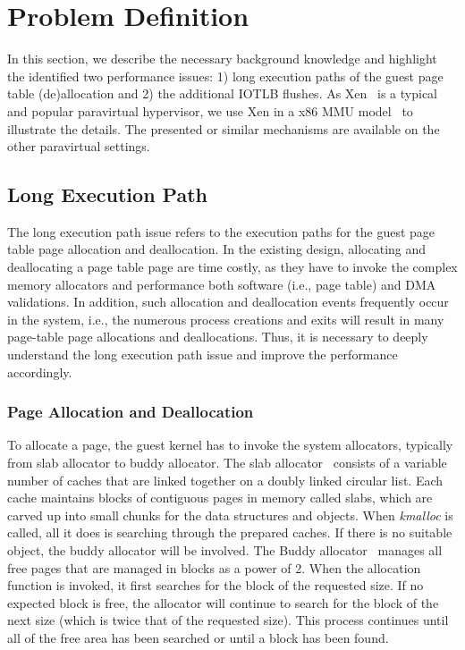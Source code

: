 \section{Problem Definition} \label{sec:prob}
In this section, we describe the necessary background knowledge and highlight the identified two performance issues: 1) long execution paths of the guest page table (de)allocation and 2) the additional IOTLB flushes.
As Xen~\cite{XEN-SOSP03} is a typical and popular paravirtual hypervisor, we use Xen in a x86 MMU model~\cite{x86-pv-model} to illustrate the details.
The presented or similar mechanisms are available on the other paravirtual settings.


\subsection{Long Execution Path}\label{sec:longpath}
The long execution path issue refers to the execution paths for the guest page table page allocation and deallocation.
In the existing design, allocating and deallocating a page table page are time costly, as they have to invoke the complex memory allocators and performance both software (i.e., page table) and DMA validations.
In addition, such allocation and deallocation events frequently occur in the system, i.e., the numerous process creations and exits will result in many page-table page allocations and deallocations.
Thus, it is necessary to deeply understand the long execution path issue and improve the performance accordingly.

\subsubsection{Page Allocation and Deallocation}
To allocate a page, the guest kernel has to invoke the system allocators, typically from slab allocator to buddy allocator.
The slab allocator~\cite{slaballocator} consists of a variable number of caches that are linked together on a doubly linked circular list.
Each cache maintains blocks of contiguous pages in memory called slabs, which are carved up into small chunks for the data structures and objects.
When \emph{kmalloc} is called, all it does is searching through the prepared caches.
If there is no suitable object, the buddy allocator will be involved.
The Buddy allocator~\cite{buddyallocator} manages all free pages that are managed in blocks as a power of 2.
When the allocation function is invoked, it first searches for the block of the requested size.
If no expected block is free, the allocator will continue to search for the block of the next size (which is twice that of the requested size).
This process continues until all of the free area has been searched or until a block has been found.

